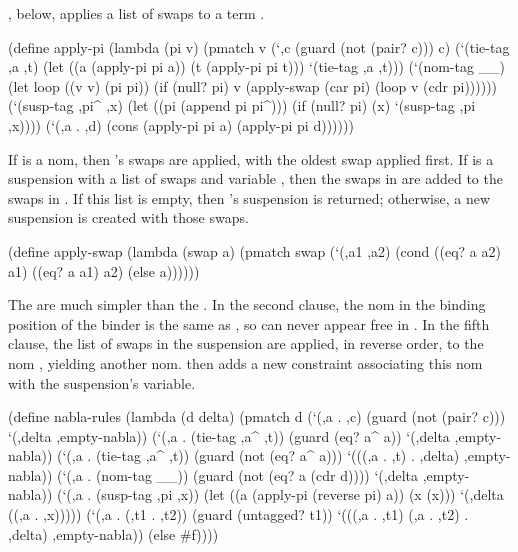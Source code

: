 \newpage

, below, applies a list of swaps  to a term .

\schemedisplayspace
\begin{schemedisplay}
(define apply-pi
  (lambda (pi v)
    (pmatch v
      (`,c (guard (not (pair? c))) c)
      (`(tie-tag ,a ,t)
       (let ((a (apply-pi pi a))
             (t (apply-pi pi t)))
         `(tie-tag ,a ,t)))
      (`(nom-tag __)
       (let loop ((v v) (pi pi))
         (if (null? pi)
             v
             (apply-swap (car pi) (loop v (cdr pi))))))
      (`(susp-tag ,pi^ ,x)
       (let ((pi (append pi pi^)))
         (if (null? pi)
             (x)
             `(susp-tag ,pi ,x))))
      (`(,a . ,d) (cons (apply-pi pi a) (apply-pi pi d))))))
\end{schemedisplay}

\noindent If  is a nom, then  's swaps are applied,
with the oldest swap applied first.  If  is a suspension
with a list of swaps  and variable , then
the swaps in  are added to the swaps in .
If this list is empty, then 's suspension is
returned; otherwise, a new suspension is created with those swaps.

\schemedisplayspace
\begin{schemedisplay}
(define apply-swap
  (lambda (swap a)
    (pmatch swap
      (`(,a1 ,a2)
       (cond
         ((eq? a a2) a1)
         ((eq? a a1) a2)
         (else a))))))
\end{schemedisplay}

The  are much simpler than the .  
In the second clause, the nom  in the binding position of the binder 
is the same as , so  can never appear free in .
In the fifth clause, the list of swaps  in the suspension are
applied, in reverse order, to the nom , yielding another nom.
 then adds a new constraint associating this nom with
the suspension's variable.

\newpage

\schemedisplayspace
\begin{schemedisplay}
(define nabla-rules
  (lambda (d delta)
    (pmatch d
      (`(,a . ,c)
       (guard (not (pair? c)))
       `(,delta ,empty-nabla))
      (`(,a . (tie-tag ,a^ ,t))
       (guard (eq? a^ a))
       `(,delta ,empty-nabla))
      (`(,a . (tie-tag ,a^ ,t))
       (guard (not (eq? a^ a)))
       `(((,a . ,t) . ,delta) ,empty-nabla))
      (`(,a . (nom-tag __))
       (guard (not (eq? a (cdr d))))
       `(,delta ,empty-nabla))
      (`(,a . (susp-tag ,pi ,x))
       (let ((a (apply-pi (reverse pi) a)) (x (x)))
         `(,delta ((,a . ,x)))))
      (`(,a . (,t1 . ,t2))
       (guard (untagged? t1))
       `(((,a . ,t1) (,a . ,t2) . ,delta) ,empty-nabla))
      (else #f))))
\end{schemedisplay}


